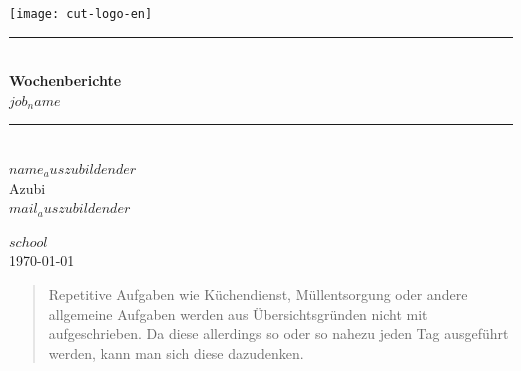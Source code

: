 \documentclass[11pt,a4paper]{article}
\newcommand{\HRule}{\rule{\linewidth}{0.5mm}}
\begin{document}
\begin{titlepage}
\begin{center}
  \texttt{[image: cut-logo-en]}~\\[2cm]


  \HRule \\[0.4cm]
  { \LARGE 
    \textbf{Wochenberichte}\\[0.4cm]
    \emph{$job_name$}\\[0.4cm]
  }
  \HRule \\[1.5cm]



  { \large
    $name_auszubildender$ \\[0.1cm]
    Azubi\\[0.1cm]
    \texttt{$mail_auszubildender$}
  }

  \vfill

  \textsc{\large $school$}\\[0.4cm]


  {\large \today}
  
  \end{center}
  \end{titlepage}

  \newpage

  \begin{abstract}
  
    Repetitive Aufgaben wie Küchendienst, Müllentsorgung oder andere allgemeine Aufgaben werden aus Übersichtsgründen nicht mit aufgeschrieben. Da diese allerdings so oder so nahezu jeden Tag ausgeführt werden, kann man sich diese dazudenken.

  \end{abstract}

  \newpage



  \tableofcontents
  \newpage
  \setcounter{page}{1}


  


  \newpage
\end{document}
